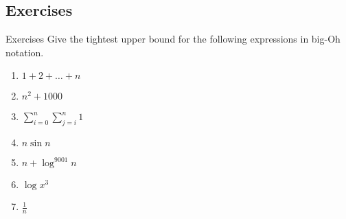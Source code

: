 \documentclass[9pt]{beamer}
\begin{document}
\subsection{Exercises}
\begin{frame}{Exercises}
  Give the tightest upper bound for the following expressions in big-Oh
  notation.
  \begin{enumerate}
    \item
      $1 + 2 + \dots + n$ 
    \item
      $n^2+1000$ 
    \item
      $\sum_{i=0}^n\sum_{j=i}^n1$ 
    \item
      $n\sin{n}$ 
    \item
      $n + \log^{9001}{n}$ 
    \item
      $\log{x^3}$ 
    \item
      $\frac{1}{n}$ 
    \pause
  \end{enumerate}
\end{frame}
\end{document}
